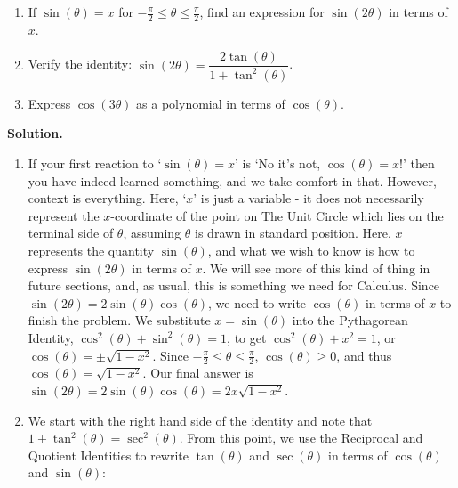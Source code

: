 \documentclass{ximera}
\begin{document}
\begin{example}  \label{doubleangleex} $~$

\begin{enumerate}

\item  If $\sin(\theta) = x$ for $-\frac{\pi}{2} \leq \theta \leq \frac{\pi}{2}$, find an expression for $\sin(2\theta)$ in terms of $x$.

\item  \label{doubleanglesinewtan} Verify the identity:  $\sin(2\theta) = \dfrac{2\tan(\theta)}{1 + \tan^{2}(\theta)}$.

\item  Express $\cos(3\theta)$ as a polynomial in terms of $\cos(\theta)$.
\label{cosinepolynomial}

\end{enumerate}


{\bf Solution.}

\begin{enumerate}

\item  If your first reaction to `$\sin(\theta) = x$' is `No it's not, $\cos(\theta) = x$!' then you have indeed learned something, and we take comfort in that. However, context is everything.  Here, `$x$' is just a variable - it does not necessarily represent the $x$-coordinate of the point on The Unit Circle which lies on the terminal side of $\theta$, assuming $\theta$ is drawn in standard position.  Here, $x$ represents the quantity $\sin(\theta)$, and what we wish to know is how to express $\sin(2\theta)$ in terms of $x$.  We will see more of this kind of thing in future sections, and, as usual, this is something we need for Calculus.  Since $\sin(2\theta) = 2 \sin(\theta) \cos(\theta)$, we need to write $\cos(\theta)$ in terms of $x$ to finish the problem.  We substitute $x = \sin(\theta)$ into the Pythagorean Identity, $\cos^{2}(\theta) + \sin^{2}(\theta) = 1$, to get $\cos^{2}(\theta) + x^2 = 1$, or $\cos(\theta) = \pm \sqrt{1-x^2}$.  Since  $-\frac{\pi}{2} \leq \theta \leq \frac{\pi}{2}$, $\cos(\theta) \geq 0$, and thus $\cos(\theta) = \sqrt{1-x^2}$.  Our final answer is  $\sin(2\theta) = 2 \sin(\theta) \cos(\theta) = 2x\sqrt{1-x^2}$.

\item  We start with the right hand side of the identity and note that $1 + \tan^{2}(\theta) = \sec^{2}(\theta)$.  From this point, we use the Reciprocal and Quotient Identities to rewrite $\tan(\theta)$ and $\sec(\theta)$ in terms of $\cos(\theta)$ and $\sin(\theta)$:


\end{enumerate}
\end{example}
\end{document}
